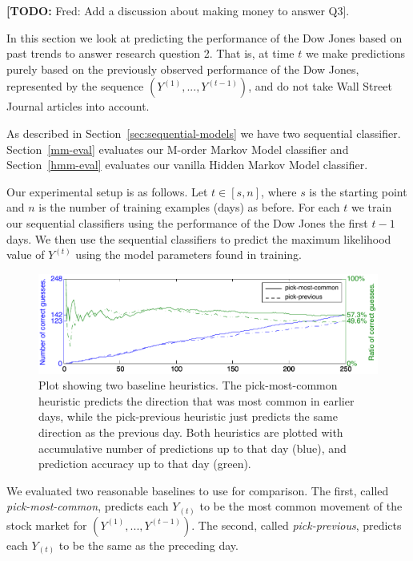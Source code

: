 \documentclass[10pt, twocolumn]{article}
\def\TODO#1{\noindent\textbf{[TODO:} #1]}
\begin{document}
\TODO{Fred: Add a discussion about making money to answer Q3}.

In this section we look at predicting the performance of the Dow Jones based on past trends to answer research question 2.
That is, at time $t$ we make predictions purely based on the previously observed performance of the Dow Jones, represented by the sequence $(Y^{(1)}, ..., Y^{(t-1)})$, and do not take Wall Street Journal articles into account.

As described in Section~\ref{sec:sequential-models} we have two sequential classifier.
Section~\ref{mm-eval} evaluates our M-order Markov Model classifier and Section~\ref{hmm-eval} evaluates our vanilla Hidden Markov Model classifier.

Our experimental setup is as follows.
Let $t\in{}[s,n]$, where $s$ is the starting point and $n$ is the number of training examples (days) as before.
For each $t$ we train our sequential classifiers using the performance of the Dow Jones the first $t-1$ days.
We then use the sequential classifiers to predict the maximum likelihood value of $Y^{(t)}$ using the model parameters found in training.

\begin{figure}
\center
\hspace{0.5cm}
\includegraphics[width=16cm]{experiments/seq_baseline.pdf}
\caption{Plot showing two baseline heuristics. The pick-most-common heuristic predicts the direction that was most common in earlier days, while the pick-previous heuristic just predicts the same direction as the previous day. Both heuristics are plotted with accumulative number of predictions up to that day (blue), and prediction accuracy up to that day (green).}
\label{fig:seq-baseline}
\end{figure}

We evaluated two reasonable baselines to use for comparison.
The first, called \emph{pick-most-common}, predicts each $Y_{(t)}$ to be the most common movement of the stock market for $(Y^{(1)}, ..., Y^{(t-1)})$.
The second, called \emph{pick-previous}, predicts each $Y_{(t)}$ to be the same as the preceding day.
\end{document}
